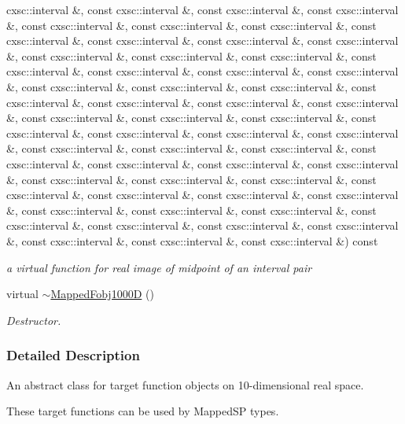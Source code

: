 \begin{DoxyCompactItemize}
cxsc\-::interval \&, const cxsc\-::interval \&, const cxsc\-::interval \&, const cxsc\-::interval \&, const cxsc\-::interval \&, const cxsc\-::interval \&, const cxsc\-::interval \&, const cxsc\-::interval \&, const cxsc\-::interval \&, const cxsc\-::interval \&, const cxsc\-::interval \&, const cxsc\-::interval \&, const cxsc\-::interval \&, const cxsc\-::interval \&, const cxsc\-::interval \&, const cxsc\-::interval \&, const cxsc\-::interval \&, const cxsc\-::interval \&, const cxsc\-::interval \&, const cxsc\-::interval \&, const cxsc\-::interval \&, const cxsc\-::interval \&, const cxsc\-::interval \&, const cxsc\-::interval \&, const cxsc\-::interval \&, const cxsc\-::interval \&, const cxsc\-::interval \&, const cxsc\-::interval \&, const cxsc\-::interval \&, const cxsc\-::interval \&, const cxsc\-::interval \&, const cxsc\-::interval \&, const cxsc\-::interval \&, const cxsc\-::interval \&, const cxsc\-::interval \&, const cxsc\-::interval \&, const cxsc\-::interval \&, const cxsc\-::interval \&, const cxsc\-::interval \&, const cxsc\-::interval \&, const cxsc\-::interval \&, const cxsc\-::interval \&, const cxsc\-::interval \&, const cxsc\-::interval \&, const cxsc\-::interval \&, const cxsc\-::interval \&, const cxsc\-::interval \&, const cxsc\-::interval \&, const cxsc\-::interval \&, const cxsc\-::interval \&, const cxsc\-::interval \&, const cxsc\-::interval \&, const cxsc\-::interval \&, const cxsc\-::interval \&, const cxsc\-::interval \&, const cxsc\-::interval \&) const 
\begin{DoxyCompactList}\small\item\em a virtual function for real image of midpoint of an interval pair \end{DoxyCompactList}\item 
virtual \hyperlink{classsubpavings_1_1MappedFobj1000D_aceb12944347dfc2fff0855322cc494c5}{$\sim$\-Mapped\-Fobj1000\-D} ()
\begin{DoxyCompactList}\small\item\em \-Destructor. \end{DoxyCompactList}\end{DoxyCompactItemize}


\subsubsection{\-Detailed \-Description}
\-An abstract class for target function objects on 10-\/dimensional real space. 

\-These target functions can be used by \-Mapped\-S\-P types. 

